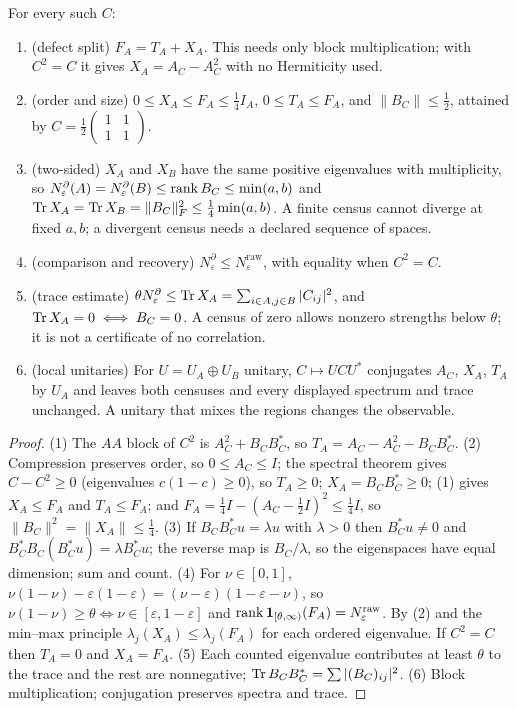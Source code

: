 \begin{theorem}\label{thm:weight}
For every such $C$:
\begin{enumerate}
\item (defect split) $F_A=T_A+X_A$. This needs only block multiplication; with $C^2=C$ it gives $X_A=A_C-A_C^2$ with no Hermiticity used. 
\item (order and size) $0\le X_A\le F_A\le\tfrac14I_A$, $0\le T_A\le F_A$, and $\|B_C\|\le\tfrac12$, attained by $C=\tfrac12\begin{pmatrix}1&1\\1&1\end{pmatrix}$. 
\item (two-sided) $X_A$ and $X_B$ have the same positive eigenvalues with multiplicity, so $N^\partial_\varepsilon(A)=N^\partial_\varepsilon(B)\le\operatorname{rank} B_C\le\min(a,b)$ and $\operatorname{Tr} X_A=\operatorname{Tr} X_B=\|B_C\|_F^2\le\tfrac14\min(a,b)$. A finite census cannot diverge at fixed $a,b$; a divergent census needs a declared sequence of spaces. 
\item (comparison and recovery) $N^\partial_\varepsilon\le N^{\mathrm{raw}}_\varepsilon$, with equality when $C^2=C$. 
\item (trace estimate) $\theta N^\partial_\varepsilon\le\operatorname{Tr} X_A=\sum_{i\in A,j\in B}|C_{ij}|^2$, and $\operatorname{Tr} X_A=0\iff B_C=0$. A census of zero allows nonzero strengths below $\theta$; it is not a certificate of no correlation. 
\item (local unitaries) For $U=U_A\oplus U_B$ unitary, $C\mapsto UCU^*$ conjugates $A_C$, $X_A$, $T_A$ by $U_A$ and leaves both censuses and every displayed spectrum and trace unchanged. A unitary that mixes the regions changes the observable. 
\end{enumerate}
\end{theorem}
\begin{proof}
(1) The $AA$ block of $C^2$ is $A_C^2+B_CB_C^*$, so $T_A=A_C-A_C^2-B_CB_C^*$. (2) Compression preserves order, so $0\le A_C\le I$; the spectral theorem gives $C-C^2\ge0$ (eigenvalues $c(1-c)\ge0$), so $T_A\ge0$; $X_A=B_CB_C^*\ge0$; (1) gives $X_A\le F_A$ and $T_A\le F_A$; and $F_A=\tfrac14I-(A_C-\tfrac12I)^2\le\tfrac14I$, so $\|B_C\|^2=\|X_A\|\le\tfrac14$. (3) If $B_CB_C^*u=\lambda u$ with $\lambda>0$ then $B_C^*u\neq0$ and $B_C^*B_C(B_C^*u)=\lambda B_C^*u$; the reverse map is $B_C/\lambda$, so the eigenspaces have equal dimension; sum and count. (4) For $\nu\in[0,1]$, $\nu(1-\nu)-\varepsilon(1-\varepsilon)=(\nu-\varepsilon)(1-\varepsilon-\nu)$, so $\nu(1-\nu)\ge\theta\iff\nu\in[\varepsilon,1-\varepsilon]$ and $\operatorname{rank}\mathbf 1_{[\theta,\infty)}(F_A)=N^{\mathrm{raw}}_\varepsilon$. By (2) and the min–max principle $\lambda_j(X_A)\le\lambda_j(F_A)$ for each ordered eigenvalue. If $C^2=C$ then $T_A=0$ and $X_A=F_A$. (5) Each counted eigenvalue contributes at least $\theta$ to the trace and the rest are nonnegative; $\operatorname{Tr} B_CB_C^*=\sum|(B_C)_{ij}|^2$. (6) Block multiplication; conjugation preserves spectra and trace.
\end{proof}

